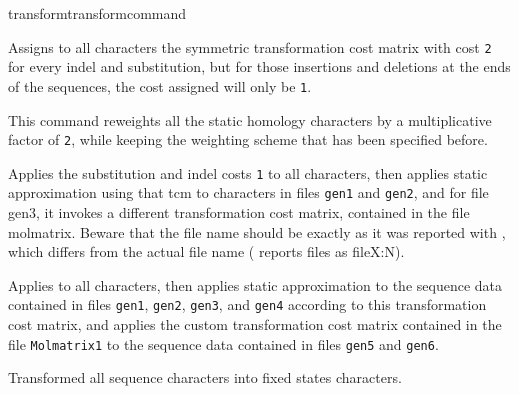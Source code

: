 \begin{command}{transform}{transformcommand}
\begin{poyexamples}
		{Assigns to all characters the symmetric transformation cost
		matrix with cost \texttt{2} for every indel and substitution, but for those
		insertions and deletions at the ends of the sequences, the cost
		assigned will only be \texttt{1}.}
		
            	{This command reweights all the static homology characters
            	by a multiplicative factor of \texttt{2}, while keeping the weighting
            	scheme that has been specified before.}
		
		

            	{Applies the substitution and indel costs \texttt{1} to all characters, then applies static approximation
            	using that tcm to characters in files \texttt{gen1} and \texttt{gen2}, and for file
            	gen3, it invokes a different transformation cost matrix, contained
            	in the file molmatrix. Beware that the file name should be exactly
            	as it was reported with , which differs from the actual
            	file name ( reports files as fileX:N).}

            	{Applies  to all characters, then applies
            	static approximation to the sequence data contained in files \texttt{gen1}, \texttt{gen2},
            	\texttt{gen3}, and \texttt{gen4} according to this transformation cost
            	matrix, and applies the custom transformation cost matrix contained in the file
            	\texttt{Molmatrix1} to the sequence data contained in files \texttt{gen5} and
            	\texttt{gen6}.}
         
        		 {Transformed all sequence characters into fixed states characters.}
            

\end{poyexamples}
\end{command}
